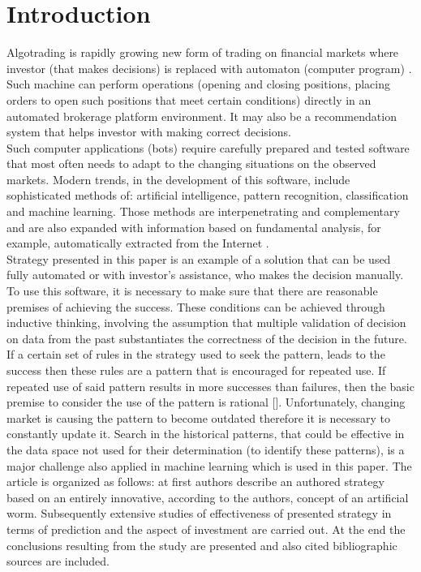 \documentclass[runningheads,a4paper]{llncs}
\begin{document}
\section{Introduction}

Algotrading is rapidly growing new form of trading on financial markets where investor (that makes decisions) is replaced with automaton (computer program) \cite{Leshik2011}. Such machine can perform operations (opening and closing positions, placing orders to open such positions that meet certain conditions) directly in an automated brokerage platform environment. It may also be a recommendation system that helps investor with making correct decisions.\\

Such computer applications (bots) require carefully prepared and tested software that most often needs to adapt to the changing situations on the observed markets. Modern trends, in the development of this software, include sophisticated methods of: artificial intelligence, pattern recognition, classification and machine learning. Those methods are interpenetrating and complementary and are also expanded with information based on fundamental analysis, for example, automatically extracted from the Internet \cite{elder}\cite{Wilinski2014}\cite{Schwager1996}.\\

Strategy presented in this paper is an example of a solution that can be used fully automated or with investor’s assistance, who makes the decision manually. To use this software, it is necessary to make sure that there are reasonable premises of achieving the success. These conditions can be achieved through inductive thinking, involving the assumption that multiple validation of decision on data from the past substantiates the correctness of the decision in the future. If a certain set of rules in the strategy used to seek the pattern, leads to the success then these rules are a pattern that is encouraged for repeated use. If repeated use of said pattern results in more successes than failures, then the basic premise to consider the use of the pattern is rational []. Unfortunately, changing market is causing the pattern to become outdated therefore it is necessary to constantly update it. Search in the historical patterns, that could be effective in the data space not used for their determination (to identify these patterns), is a major challenge also applied in machine learning which is used in this paper.
The article is organized as follows: at first authors describe an authored strategy based on an entirely innovative, according to the authors, concept of an artificial worm. Subsequently extensive studies of effectiveness of presented strategy in terms of prediction and the aspect of investment are carried out. At the end the conclusions resulting from the study are presented and also cited bibliographic sources are included.
\end{document}
